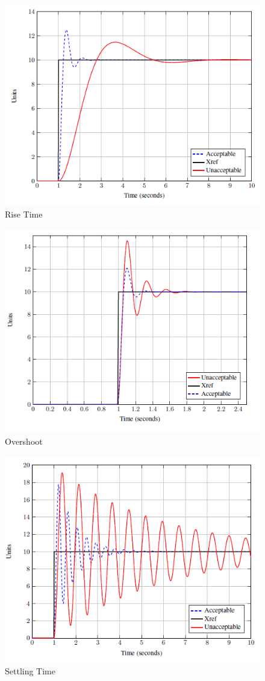 \begin{figure}[h]
    \centering
    \includegraphics[width=.6\textwidth]{Figs/risetime.PNG}
    \caption{Rise Time}
    \label{fig:risetime}
\end{figure}
\begin{figure}[h]
    \centering
    \includegraphics[width=.6\textwidth]{Figs/overshoot.PNG}
    \caption{Overshoot}
    \label{fig:overshoot}
\end{figure}
\begin{figure}[ht]
    \centering
    \includegraphics[width=.6\textwidth]{Figs/settime.PNG}
    \caption{Settling Time}
    \label{fig:settime}
\end{figure}
